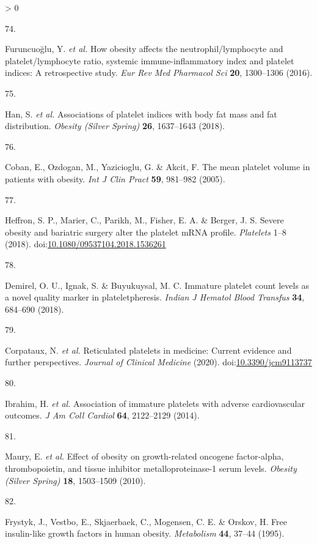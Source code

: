 \documentclass[11pt,twoside]{bristolthesis}
\newlength{\cslhangindent}
\newlength{\csllabelwidth}
\newenvironment{CSLReferences}[2] %
 {%
  \setlength{\parindent}{0pt}
  \ifodd #1 \everypar{\setlength{\hangindent}{\cslhangindent}}\ignorespaces\fi
  \ifnum #2 > 0
  \setlength{\parskip}{#2\baselineskip}
  \fi
 }%
 {}
\newcommand{\CSLLeftMargin}[1]{\parbox[t]{\csllabelwidth}{#1}}
\newcommand{\CSLRightInline}[1]{\parbox[t]{\linewidth - \csllabelwidth}{#1}\break}
\begin{document}
\begin{CSLReferences}{0}{0}
\leavevmode\hypertarget{ref-Furuncuoglu2016}{}%
\CSLLeftMargin{74. }
\CSLRightInline{Furuncuoğlu, Y. \emph{et al.} How obesity affects the neutrophil/lymphocyte and platelet/lymphocyte ratio, systemic immune-inflammatory index and platelet indices: A retrospective study. \emph{Eur Rev Med Pharmacol Sci} \textbf{20}, 1300--1306 (2016).}

\leavevmode\hypertarget{ref-Han2018a}{}%
\CSLLeftMargin{75. }
\CSLRightInline{Han, S. \emph{et al.} Associations of platelet indices with body fat mass and fat distribution. \emph{Obesity (Silver Spring)} \textbf{26}, 1637--1643 (2018).}

\leavevmode\hypertarget{ref-Coban2005}{}%
\CSLLeftMargin{76. }
\CSLRightInline{Coban, E., Ozdogan, M., Yazicioglu, G. \& Akcit, F. The mean platelet volume in patients with obesity. \emph{Int J Clin Pract} \textbf{59}, 981--982 (2005).}

\leavevmode\hypertarget{ref-Heffron2018}{}%
\CSLLeftMargin{77. }
\CSLRightInline{Heffron, S. P., Marier, C., Parikh, M., Fisher, E. A. \& Berger, J. S. Severe obesity and bariatric surgery alter the platelet mRNA profile. \emph{Platelets} 1--8 (2018). doi:\href{https://doi.org/10.1080/09537104.2018.1536261}{10.1080/09537104.2018.1536261}}

\leavevmode\hypertarget{ref-UnayDemirel2018a}{}%
\CSLLeftMargin{78. }
\CSLRightInline{Demirel, O. U., Ignak, S. \& Buyukuysal, M. C. Immature platelet count levels as a novel quality marker in plateletpheresis. \emph{Indian J Hematol Blood Transfus} \textbf{34}, 684--690 (2018).}

\leavevmode\hypertarget{ref-Corpataux2020}{}%
\CSLLeftMargin{79. }
\CSLRightInline{Corpataux, N. \emph{et al.} Reticulated platelets in medicine: Current evidence and further perspectives. \emph{Journal of Clinical Medicine} (2020). doi:\href{https://doi.org/10.3390/jcm9113737}{10.3390/jcm9113737}}

\leavevmode\hypertarget{ref-Ibrahim2014}{}%
\CSLLeftMargin{80. }
\CSLRightInline{Ibrahim, H. \emph{et al.} Association of immature platelets with adverse cardiovascular outcomes. \emph{J Am Coll Cardiol} \textbf{64}, 2122--2129 (2014).}

\leavevmode\hypertarget{ref-Maury2010a}{}%
\CSLLeftMargin{81. }
\CSLRightInline{Maury, E. \emph{et al.} Effect of obesity on growth-related oncogene factor-alpha, thrombopoietin, and tissue inhibitor metalloproteinase-1 serum levels. \emph{Obesity (Silver Spring)} \textbf{18}, 1503--1509 (2010).}

\leavevmode\hypertarget{ref-Frystyk1995}{}%
\CSLLeftMargin{82. }
\CSLRightInline{Frystyk, J., Vestbo, E., Skjaerbaek, C., Mogensen, C. E. \& Orskov, H. Free insulin-like growth factors in human obesity. \emph{Metabolism} \textbf{44}, 37--44 (1995).}


\end{CSLReferences}
\end{document}
